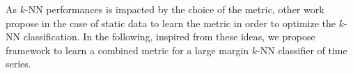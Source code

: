 As $k$-NN performances is impacted by the choice of the metric, other work propose in the case of static data to learn the metric in order to optimize the $k$-NN classification. In the following, inspired from these ideas, we propose framework to learn a combined metric for a large margin $k$-NN classifier of time series.







